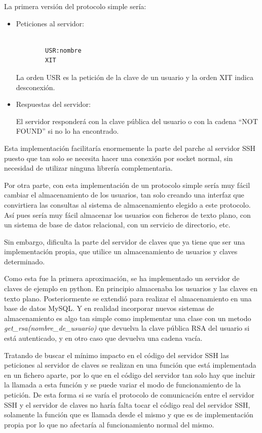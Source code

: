     La primera versión del protocolo simple sería:
    \begin{itemize}
    \item Peticiones al servidor:

        \begin{verbatim}

        USR:nombre
        XIT

        \end{verbatim}

        La orden USR es la petición de la clave de un usuario y la orden
        XIT indica desconexión.

    \item Respuestas del servidor:

        El servidor responderá con la clave pública del usuario o con la
        cadena ``NOT FOUND'' si no lo ha encontrado.

    \end{itemize}

    Esta implementación facilitaría enormemente la parte del parche al
    servidor SSH puesto que tan solo se necesita hacer una conexión por
    socket normal, sin necesidad de utilizar ninguna librería
    complementaria.

    Por otra parte, con esta implementación de un protocolo simple sería
    muy fácil cambiar el almacenamiento de los usuarios, tan solo creando
    una interfaz que convirtiera las consultas al sistema de almacenamiento
    elegido a este protocolo. Así pues sería muy fácil almacenar los
    usuarios con ficheros de texto plano, con un sistema de base de datos
    relacional, con un servicio de directorio, etc.
    
    Sin embargo, dificulta la parte del servidor de claves que ya tiene
    que ser una implementación propia, que utilice un almacenamiento de
    usuarios y claves determinado.

    Como esta fue la primera aproximación, se ha implementado un servidor
    de claves de ejemplo en python. En principio almacenaba los usuarios y
    las claves en texto plano. Posteriormente se extendió para realizar el
    almacenamiento en una base de datos MySQL. Y en realidad incorporar
    nuevos sistemas de almacenamiento es algo tan simple como implementar
    una clase con un metodo \textit{get\_rsa(nombre\_de\_usuario)} que devuelva
    la clave pública RSA del usuario si está autenticado, y en otro caso
    que devuelva una cadena vacía.

    Tratando de buscar el mínimo impacto en el código del servidor SSH las
    peticiones al servidor de claves se realizan en una función que está
    implementada en un fichero aparte, por lo que en el código del servidor
    tan solo hay que incluir la llamada a esta función y se puede variar
    el modo de funcionamiento de la petición. De esta forma si se varía el
    protocolo de comunicación entre el servidor SSH y el servidor de claves
    no haría falta tocar el código real del servidor SSH, solamente la
    función que es llamada desde el mismo y que es de implementación
    propia por lo que no afectaría al funcionamiento normal del mismo.

